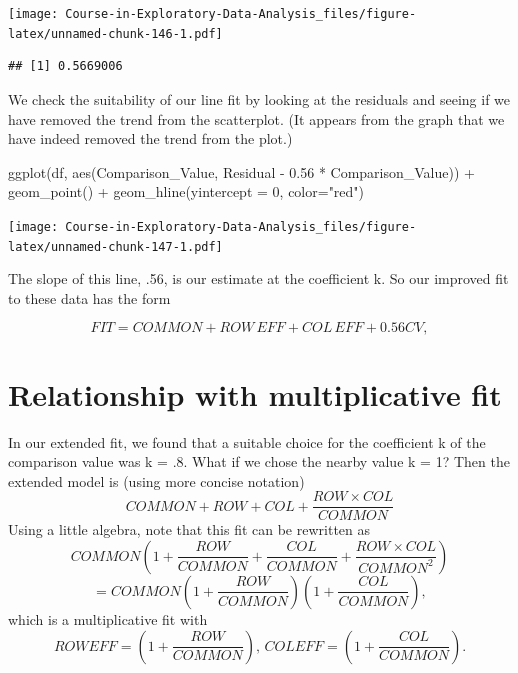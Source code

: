 \documentclass[
]{book}
\newenvironment{Shaded}{\begin{snugshade}}{\end{snugshade}}
\newcommand{\AttributeTok}[1]{\textcolor[rgb]{0.77,0.63,0.00}{#1}}
\newcommand{\DecValTok}[1]{\textcolor[rgb]{0.00,0.00,0.81}{#1}}
\newcommand{\FloatTok}[1]{\textcolor[rgb]{0.00,0.00,0.81}{#1}}
\newcommand{\FunctionTok}[1]{\textcolor[rgb]{0.00,0.00,0.00}{#1}}
\newcommand{\NormalTok}[1]{#1}
\newcommand{\SpecialCharTok}[1]{\textcolor[rgb]{0.00,0.00,0.00}{#1}}
\newcommand{\StringTok}[1]{\textcolor[rgb]{0.31,0.60,0.02}{#1}}
\begin{document}
\texttt{[image: Course-in-Exploratory-Data-Analysis\_files/figure-latex/unnamed-chunk-146-1.pdf]}

\begin{Shaded}
\end{Shaded}

\begin{verbatim}
## [1] 0.5669006
\end{verbatim}

We check the suitability of our line fit by looking at the residuals and seeing if we have removed the trend from the scatterplot. (It appears from the graph that we have indeed removed the trend from the plot.)

\begin{Shaded}
\begin{Highlighting}[]
\FunctionTok{ggplot}\NormalTok{(df, }\FunctionTok{aes}\NormalTok{(Comparison\_Value, }
\NormalTok{               Residual }\SpecialCharTok{{-}} \FloatTok{0.56} \SpecialCharTok{*}\NormalTok{ Comparison\_Value)) }\SpecialCharTok{+}
  \FunctionTok{geom\_point}\NormalTok{() }\SpecialCharTok{+}
  \FunctionTok{geom\_hline}\NormalTok{(}\AttributeTok{yintercept =} \DecValTok{0}\NormalTok{, }\AttributeTok{color=}\StringTok{"red"}\NormalTok{)}
\end{Highlighting}
\end{Shaded}

\texttt{[image: Course-in-Exploratory-Data-Analysis\_files/figure-latex/unnamed-chunk-147-1.pdf]}

The slope of this line, .56, is our estimate at the coefficient k. So our improved fit to these data has the form

\[
FIT = COMMON + ROW \, EFF + COL \, EFF + 0.56 CV,
\]

\hypertarget{relationship-with-multiplicative-fit}{%
\section{Relationship with multiplicative fit}\label{relationship-with-multiplicative-fit}}

In our extended fit, we found that a suitable choice for the coefficient k of the comparison value was k = .8. What if we chose the nearby value k = 1? Then the extended model is (using more concise notation)
\[
COMMON + ROW + COL + \frac{ROW \times COL}{COMMON}
\]
Using a little algebra, note that this fit can be rewritten as
\[
COMMON \left(1 + \frac{ROW}{COMMON} + \frac{COL}{COMMON} +
\frac{ROW \times COL}{COMMON^2}\right)
\]
\[
= COMMON \left(1 + \frac{ROW}{COMMON}\right) \left(1 + \frac{COL}{COMMON}\right),
\]
which is a multiplicative fit with
\[
ROWEFF = \left(1 + \frac{ROW}{COMMON}\right), \,
COLEFF = \left(1 + \frac{COL}{COMMON}\right).
\]
\end{document}
